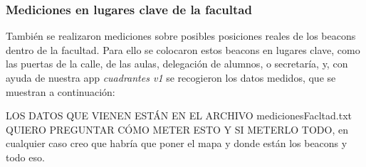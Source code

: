 \subsubsection{Mediciones en lugares clave de la facultad}

También se realizaron mediciones sobre posibles posiciones reales de los beacons dentro de la facultad. Para ello se colocaron estos beacons en lugares clave, como las puertas de la calle, de las aulas, delegación de alumnos, o secretaría, y, con ayuda de nuestra app \textit{cuadrantes v1} se recogieron los datos medidos, que se muestran a continuación: 

LOS DATOS QUE VIENEN ESTÁN EN EL ARCHIVO medicionesFacltad.txt QUIERO PREGUNTAR CÓMO METER ESTO Y SI METERLO TODO, en cualquier caso creo que habría que poner el mapa y donde están los beacons y todo eso.
